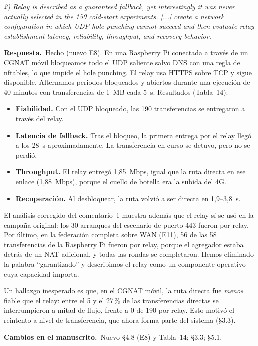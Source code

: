\documentclass[11pt,a4paper]{article}
\newenvironment{comment}{\par\medskip\noindent\begin{minipage}{\linewidth}\color{blue!45!black}\itshape}{\end{minipage}\par}
\newcommand{\reply}{\par\smallskip\noindent\textbf{Respuesta.}~}
\newcommand{\changes}{\par\smallskip\noindent\textbf{Cambios en el manuscrito.}~}
\begin{document}
\begin{comment}
2) Relay is described as a guaranteed fallback, yet interestingly it was never actually selected in the 150 cold-start experiments. [...] create a network configuration in which UDP hole-punching cannot succeed and then evaluate relay establishment latency, reliability, throughput, and recovery behavior.
\end{comment}
\reply Hecho (nuevo E8). En una Raspberry Pi conectada a través de un CGNAT móvil bloqueamos todo el UDP saliente salvo DNS con una regla de nftables, lo que impide el hole punching. El relay usa HTTPS sobre TCP y sigue disponible. Alternamos periodos bloqueados y abiertos durante una ejecución de 40 minutos con transferencias de 1~MB cada 5~s. Resultados (Tabla~14):
\begin{itemize}[leftmargin=1.3em,itemsep=0.1em]
\item \textbf{Fiabilidad.} Con el UDP bloqueado, las 190 transferencias se entregaron a través del relay.
\item \textbf{Latencia de fallback.} Tras el bloqueo, la primera entrega por el relay llegó a los 28~s aproximadamente. La transferencia en curso se detuvo, pero no se perdió.
\item \textbf{Throughput.} El relay entregó 1,85~Mbps, igual que la ruta directa en ese enlace (1,88~Mbps), porque el cuello de botella era la subida del 4G.
\item \textbf{Recuperación.} Al desbloquear, la ruta volvió a ser directa en 1,9--3,8~s.
\end{itemize}
El análisis corregido del comentario~1 muestra además que el relay sí se usó en la campaña original: los 30 arranques del escenario de puerto 443 fueron por relay. Por último, en la federación completa sobre WAN (E11), 56 de las 58 transferencias de la Raspberry Pi fueron por relay, porque el agregador estaba detrás de un NAT adicional, y todas las rondas se completaron. Hemos eliminado la palabra ``garantizado'' y describimos el relay como un componente operativo cuya capacidad importa.

Un hallazgo inesperado es que, en el CGNAT móvil, la ruta directa fue \emph{menos} fiable que el relay: entre el 5 y el 27\,\% de las transferencias directas se interrumpieron a mitad de flujo, frente a 0 de 190 por relay. Esto motivó el reintento a nivel de transferencia, que ahora forma parte del sistema (\S3.3).

\changes Nuevo \S4.8 (E8) y Tabla~14; \S3.3; \S5.1.
\end{document}
